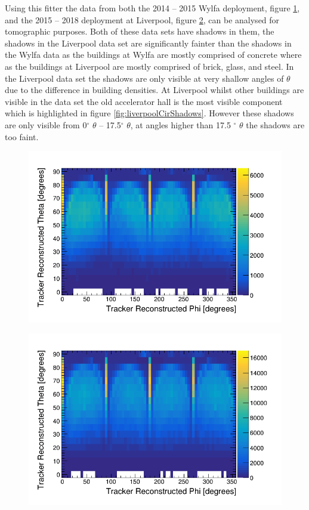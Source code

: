 Using this fitter the data from both the 2014 -- 2015 Wylfa deployment, figure \ref{fig:pVsTWylfaReversed}, and the 2015 -- 2018 deployment at Liverpool, figure \ref{fig:pVsTLiverpoolReversed}, can be analysed for tomographic purposes. Both of these data sets have shadows in them, the shadows in the Liverpool data set are significantly fainter than the shadows in the Wylfa data as the buildings at Wylfa are mostly comprised of concrete where as the buildings at Liverpool are mostly comprised of brick, glass, and steel. In the Liverpool data set the shadows are only visible at very shallow angles of $\theta$ due to the difference in building densities. At Liverpool whilst other buildings are visible in the data set the old accelerator hall is the most visible component which is highlighted in figure \ref{fig:liverpoolCirShadows}. However these shadows are only visible from 0$^{\circ}$ $\theta$ -- 17.5$^{\circ}$ $\theta$, at angles higher than 17.5 $^{\circ}$ $\theta$ the shadows are too faint. 
\begin{figure}[H]
 \centering
 \includegraphics[width=0.8\linewidth]{Chapter5/Figs/Raster/pVsTWylfaReversed.png}
 \label{fig:pVsTWylfaReversed}
\end{figure}

\begin{figure}[H]
 \centering
 \includegraphics[width=0.8\linewidth]{Chapter5/Figs/Raster/pVsTLiverpoolReversed.png}
 \label{fig:pVsTLiverpoolReversed}
\end{figure}

